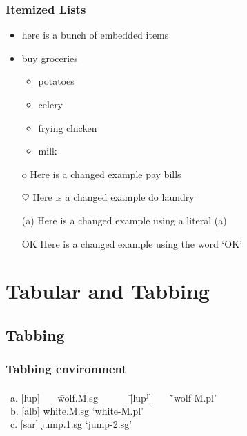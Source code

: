 \documentclass[noamsthm]{beamer}
\begin{document}
\begin{frame}
\frametitle{Itemized Lists}


\begin{itemize}
	\item here is a bunch of embedded items
	\item buy groceries
	\begin{itemize}
		\item potatoes
		\item celery
		\item frying chicken
		\item milk
	\end{itemize}
	\item[o] Here is a changed example pay bills
	\item [$\heartsuit$] Here is a changed example do laundry
	\item [(a)] Here is a changed example using a literal (a)
	\item [OK] Here is a changed example using the word `OK'

\end{itemize}

\end{frame}

\section{Tabular and Tabbing}

\subsection{Tabbing}

\begin{frame}
\frametitle{Tabbing environment}

\begin{example}  
\begin{tabbing}
~a. 	[lup] ~~~\=	wolf.M.sg  ~~~~~~\= [lup\textsuperscript{j}]  ~~~\= 	`wolf-M.pl'\\%
~b. 	[alb] 	\> white.M.sg  \> `white-M.pl' \\%
~c. 	[sar]	\> jump.1.sg 	 \> `jump-2.sg'\\ %
\end{tabbing}
\end{example}

\end{frame}
\end{document}
